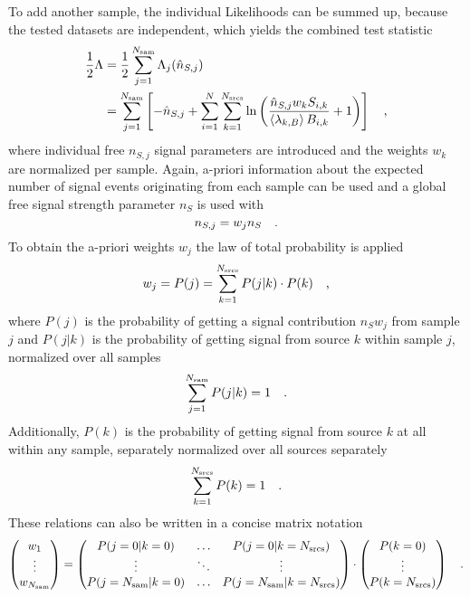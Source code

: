 To add another sample, the individual Likelihoods can be summed up, because the tested datasets are independent, which yields the combined test statistic
\begin{align}
  \frac{1}{2}\Lambda
  &= \frac{1}{2} \sum_{j=1}^{N_\text{sam}} \Lambda_j(\hat{n}_{S,j}) \\
  &= \sum_{j=1}^{N_\text{sam}} \left[ -\hat{n}_{S,j} +
    \sum_{i=1}^N \sum_{k=1}^{N_\text{srcs}} \ln\left(
      \frac{\hat{n}_{S,j} w_k S_{i,k}}{\Braket{\lambda_{k,B}} B_{i,k}}
      + 1 \right) \right]\quad\text{,} \\
\end{align}
where individual free $n_{S,j}$ signal parameters are introduced and the weights $w_k$ are normalized per sample.
Again, a-priori information about the expected number of signal events originating from each sample can be used and a global free signal strength parameter $n_S$ is used with
\begin{equation}
  n_{S,j} = w_j n_S
  \quad\text{.}
\end{equation}
To obtain the a-priori weights $w_j$ the law of total probability is applied 
\begin{equation}
  w_j = P(j) = \sum_{k=1}^{N_\text{srcs}} P(j|k)\cdot P(k)
  \quad\text{,}
\end{equation}
where $P(j)$ is the probability of getting a signal contribution $n_S w_j$ from sample $j$ and $P(j|k)$ is the probability of getting signal from source $k$ within sample $j$, normalized over all samples
\begin{equation}
  \sum_{j=1}^{N_\text{sam}} P(j|k) = 1
  \quad\text{.}
\end{equation}
Additionally, $P(k)$ is the probability of getting signal from source $k$ at all within any sample, separately normalized over all sources separately
\begin{equation}
  \sum_{k=1}^{N_\text{srcs}} P(k) = 1
  \quad\text{.}
\end{equation}
These relations can also be written in a concise matrix notation
\begin{equation}
  \begin{pmatrix} w_1 \\ \vdots \\ w_{N_\text{sam}} \end{pmatrix} =
    \begin{pmatrix}
      P(j=0|k=0) & \dots & P(j=0|k=N_\text{srcs}) \\
      \vdots & \ddots & \vdots \\
      P(j=N_\text{sam}|k=0) & \dots & P(j=N_\text{sam}|k=N_\text{srcs})
    \end{pmatrix} \cdot
    \begin{pmatrix}
      P(k=0) \\ \vdots \\ P(k=N_\text{srcs})
    \end{pmatrix}
  \quad\text{.}
\end{equation}

